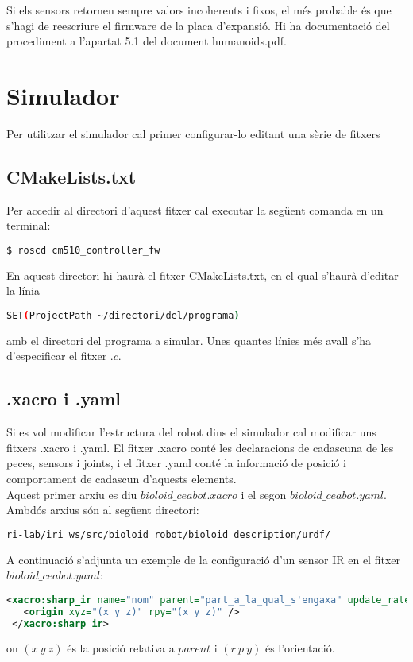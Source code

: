 \documentclass{article}
\begin{document}
Si els sensors retornen sempre valors incoherents i fixos, el més probable és que s'hagi de reescriure el firmware de la placa d'expansió. Hi ha documentació del procediment a l'apartat 5.1 del document humanoids.pdf.

\section{Simulador}
Per utilitzar el simulador cal primer configurar-lo editant una sèrie de 
fitxers
\subsection{CMakeLists.txt}
Per accedir al directori d'aquest fitxer cal executar la següent comanda en un terminal:
\begin{lstlisting}[language=bash]
$ roscd cm510_controller_fw
\end{lstlisting}
En aquest directori hi haurà el fitxer CMakeLists.txt, en el qual s'haurà d'editar la línia 
\begin{lstlisting}[language=bash]
SET(ProjectPath ~/directori/del/programa)
\end{lstlisting} amb el directori del programa a simular. Unes quantes línies més avall s'ha d'especificar el fitxer $.c$.
\subsection{.xacro i .yaml}
Si es vol modificar l'estructura del robot dins el simulador cal modificar uns fitxers .xacro i .yaml. El fitxer .xacro conté les declaracions de cadascuna de les peces, sensors i joints, i el fitxer .yaml conté la informació de posició i comportament de cadascun d'aquests elements. 
\\
Aquest primer arxiu es diu $bioloid\_ceabot.xacro$ i el segon $bioloid\_ceabot.yaml$. Ambdós arxius són al següent directori:
\begin{lstlisting}[language=bash]
ri-lab/iri_ws/src/bioloid_robot/bioloid_description/urdf/
\end{lstlisting}
A continuació s'adjunta un exemple de la configuració d'un sensor IR en el fitxer $bioloid\_ceabot.yaml$:

\begin{lstlisting}[language=xml]
 <xacro:sharp_ir name="nom" parent="part_a_la_qual_s'engaxa" update_rate="20" fov="0.05" min_range="0.1" max_range="0.8">
   <origin xyz="(x y z)" rpy="(x y z)" />
 </xacro:sharp_ir>
\end{lstlisting}
on $(x\ y\ z)$ és la posició relativa a $parent$ i $(r\ p\ y)$ és l'orientació. 
\end{document}
